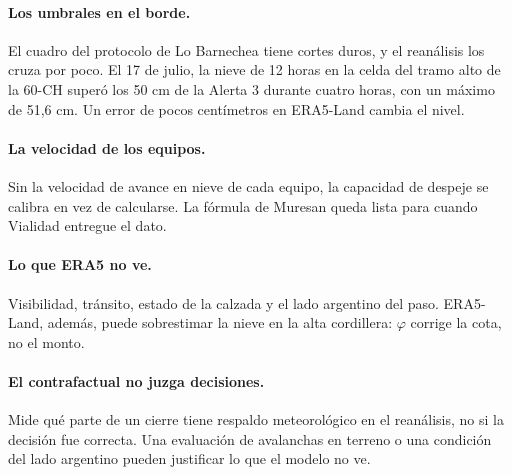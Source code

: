 \documentclass[11pt,a4paper]{article}
\begin{document}
\paragraph{Los umbrales en el borde.} El cuadro del protocolo de Lo Barnechea tiene cortes duros, y el reanálisis los cruza por poco. El 17 de julio, la nieve de 12 horas en la celda del tramo alto de la 60-CH superó los 50 cm de la Alerta 3 durante cuatro horas, con un máximo de 51,6 cm. Un error de pocos centímetros en ERA5-Land cambia el nivel.

\paragraph{La velocidad de los equipos.} Sin la velocidad de avance en nieve de cada equipo, la capacidad de despeje se calibra en vez de calcularse. La fórmula de Muresan queda lista para cuando Vialidad entregue el dato.

\paragraph{Lo que ERA5 no ve.} Visibilidad, tránsito, estado de la calzada y el lado argentino del paso. ERA5-Land, además, puede sobrestimar la nieve en la alta cordillera: $\varphi$ corrige la cota, no el monto.

\paragraph{El contrafactual no juzga decisiones.} Mide qué parte de un cierre tiene respaldo meteorológico en el reanálisis, no si la decisión fue correcta. Una evaluación de avalanchas en terreno o una condición del lado argentino pueden justificar lo que el modelo no ve.
\end{document}
